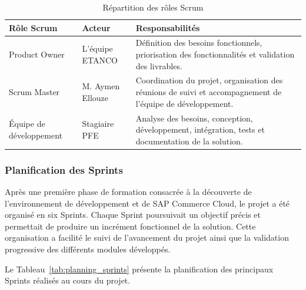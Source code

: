 \begin{table}[H]
\centering
\caption{Répartition des rôles Scrum}
\label{tab:roles_scrum}
\renewcommand{\arraystretch}{1.6}
\begin{tabular}{|p{3.3cm}|p{3.7cm}|p{8cm}|}
\hline
\textbf{Rôle Scrum} & \textbf{Acteur} & \textbf{Responsabilités} \\
\hline
Product Owner &
L'équipe ETANCO &
Définition des besoins fonctionnels, priorisation des fonctionnalités et validation des livrables. \\
\hline
Scrum Master &
M. Aymen Ellouze &
Coordination du projet, organisation des réunions de suivi et accompagnement de l'équipe de développement. \\
\hline
Équipe de développement &
Stagiaire PFE &
Analyse des besoins, conception, développement, intégration, tests et documentation de la solution. \\
\hline
\end{tabular}
\end{table}

\subsubsection{Planification des Sprints}

Après une première phase de formation consacrée à la découverte de l'environnement de développement et de SAP Commerce Cloud, le projet a été organisé en six Sprints. Chaque Sprint poursuivait un objectif précis et permettait de produire un incrément fonctionnel de la solution. Cette organisation a facilité le suivi de l'avancement du projet ainsi que la validation progressive des différents modules développés.

Le Tableau~\ref{tab:planning_sprints} présente la planification des principaux Sprints réalisés au cours du projet.

